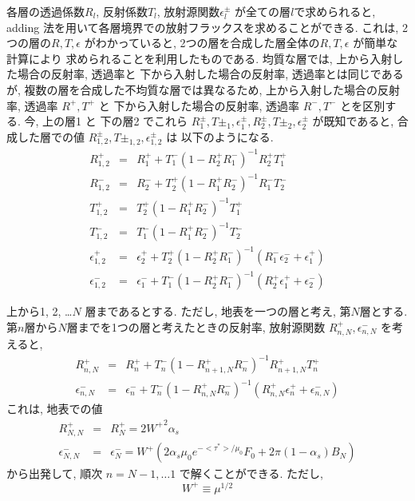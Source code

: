 各層の透過係数$R_l$, 反射係数$T_l$, 放射源関数$\epsilon^\pm_l$
が全ての層$l$で求められると,
adding 法を用いて各層境界での放射フラックスを求めることができる.
これは, 2つの層の$R,T,\epsilon$ がわかっていると,
2つの層を合成した層全体の$R,T,\epsilon$ が簡単な計算により
求められることを利用したものである.
均質な層では, 上から入射した場合の反射率, 透過率と
下から入射した場合の反射率, 透過率とは同じであるが,
複数の層を合成した不均質な層では異なるため,
上から入射した場合の反射率, 透過率 $R^+, T^+$ と
下から入射した場合の反射率, 透過率 $R^-, T^-$ とを区別する.
今, 上の層1 と 下の層2 でこれら
$R^\pm_1, T\pm_1, \epsilon^\pm_1,
 R^\pm_2, T\pm_2, \epsilon^\pm_2$ が既知であると,
合成した層での値
$R^\pm_{1,2}, T\pm_{1,2}, \epsilon^\pm_{1,2}$ は
以下のようになる.
\begin{eqnarray}
  R^+_{1,2} & = & R^+_1 + T^-_1 ( 1- R^+_2 R^-_1 )^{-1} R^+_2 T^+_1 \\
  R^-_{1,2} & = & R^-_2 + T^+_2 ( 1- R^+_1 R^-_2 )^{-1} R^-_1 T^-_2 \\
  T^+_{1,2} & = & T^+_2 ( 1- R^+_1 R^-_2 )^{-1} T^+_1 \\
  T^-_{1,2} & = & T^-_1 ( 1- R^+_1 R^-_2 )^{-1} T^-_2 \\
  \epsilon^+_{1,2} & = & \epsilon^+_2 
    + T^+_2 ( 1- R^+_2 R^-_1 )^{-1} ( R^-_1 \epsilon^-_2 + \epsilon^+_1 ) \\
  \epsilon^-_{1,2} & = & \epsilon^-_1 
    + T^-_1 ( 1- R^+_2 R^-_1 )^{-1} ( R^+_2 \epsilon^+_1 + \epsilon^-_2 ) 
\end{eqnarray}

上から1, 2, \ldots $N$ 層まであるとする. 
ただし, 地表を一つの層と考え, 第$N$層とする.
第$n$層から$N$層までを1つの層と考えたときの反射率, 放射源関数
$R^+_{n,N}, \epsilon^-_{n,N}$ を考えると,
\begin{eqnarray}
  R^+_{n,N} & = & R^+_n 
      + T^-_n ( 1- R^+_{n+1,N} R^-_n )^{-1} R^+_{n+1,N} T^+_n \\
  \epsilon^-_{n,N} & = & \epsilon^-_n
    + T^-_n ( 1- R^+_{n,N} R^-_n )^{-1} 
      ( R^+_{n,N} \epsilon^+_n + \epsilon^-_{n,N} ) 
\end{eqnarray}
これは, 地表での値
\begin{eqnarray}
  R^+_{N,N} & = &  R^+_N = 2 {W^+}^2 \alpha_s \\
  \epsilon^-_{N,N} & = &  \epsilon^-_N 
    = W^+ \left( 2 \alpha_s \mu_0 e^{-<\tau^*>/\mu_0} F_0 
                 + 2 \pi (1-\alpha_s) B_N 
          \right)
\end{eqnarray}
から出発して, 順次 $n=N-1, \ldots 1$ で解くことができる.
ただし,
\begin{equation}
  W^+ \equiv \mu^{1/2}
\end{equation}


